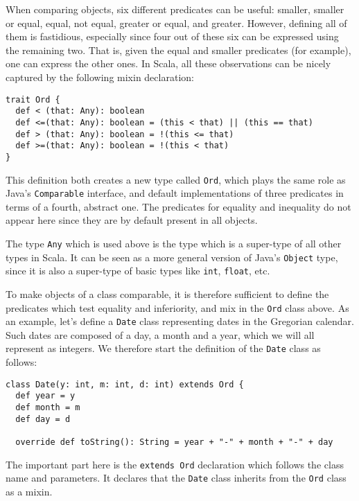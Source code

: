 \documentclass[a4paper,12pt,twoside,titlepage]{article}
\begin{document}
When comparing objects, six different predicates can be useful:
smaller, smaller or equal, equal, not equal, greater or equal, and
greater. However, defining all of them is fastidious, especially since
four out of these six can be expressed using the remaining two. That
is, given the equal and smaller predicates (for example), one can
express the other ones. In Scala, all these observations can be
nicely captured by the following mixin declaration:
\begin{lstlisting}
trait Ord {
  def < (that: Any): boolean
  def <=(that: Any): boolean = (this < that) || (this == that)
  def > (that: Any): boolean = !(this <= that)
  def >=(that: Any): boolean = !(this < that)
} 
\end{lstlisting}
This definition both creates a new type called \lstinline?Ord?, which
plays the same role as Java's \lstinline?Comparable? interface, and
default implementations of three predicates in terms of a fourth,
abstract one. The predicates for equality and inequality do not appear
here since they are by default present in all objects.

The type \lstinline?Any? which is used above is the type which is a
super-type of all other types in Scala. It can be seen as a more
general version of Java's \lstinline?Object? type, since it is also a
super-type of basic types like \lstinline?int?, \lstinline?float?, etc.

To make objects of a class comparable, it is therefore sufficient to
define the predicates which test equality and inferiority, and mix in
the \lstinline?Ord? class above. As an example, let's define a
\lstinline?Date? class representing dates in the Gregorian calendar. Such
dates are composed of a day, a month and a year, which we will all
represent as integers. We therefore start the definition of the
\lstinline?Date? class as follows:
\begin{lstlisting}
class Date(y: int, m: int, d: int) extends Ord {
  def year = y
  def month = m
  def day = d

  override def toString(): String = year + "-" + month + "-" + day
\end{lstlisting}
The important part here is the \lstinline?extends Ord? declaration which
follows the class name and parameters. It declares that the
\lstinline?Date? class inherits from the \lstinline?Ord? class as a mixin.
\end{document}
